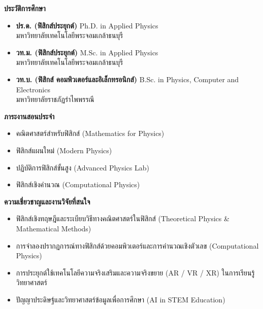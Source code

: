 \noindent
\begin{minipage}[t]{0.48\textwidth}
    {\fontsize{13}{16}\selectfont\bfseries\color{rbruGreen} ประวัติการศึกษา}\par\vspace{4pt}
    \begin{itemize}\setlength{\itemsep}{2pt}\setlength{\parsep}{0pt}\setlength{\topsep}{2pt}\setlength{\partopsep}{0pt}\setlength{\leftmargin}{12pt}
        \item \textbf{ปร.ด. (ฟิสิกส์ประยุกต์)} Ph.D. in Applied Physics\\มหาวิทยาลัยเทคโนโลยีพระจอมเกล้าธนบุรี
        \item \textbf{วท.ม. (ฟิสิกส์ประยุกต์)} M.Sc. in Applied Physics\\มหาวิทยาลัยเทคโนโลยีพระจอมเกล้าธนบุรี
        \item \textbf{วท.บ. (ฟิสิกส์ คอมพิวเตอร์และอิเล็กทรอนิกส์)} B.Sc. in Physics, Computer and Electronics\\มหาวิทยาลัยราชภัฏรำไพพรรณี
    \end{itemize}

    \vspace{0.35cm}
    {\fontsize{13}{16}\selectfont\bfseries\color{rbruGreen} ภาระงานสอนประจำ}\par\vspace{4pt}
    \begin{itemize}\setlength{\itemsep}{2pt}\setlength{\parsep}{0pt}\setlength{\topsep}{2pt}\setlength{\partopsep}{0pt}\setlength{\leftmargin}{12pt}
        \item คณิตศาสตร์สำหรับฟิสิกส์ (Mathematics for Physics)
        \item ฟิสิกส์แผนใหม่ (Modern Physics)
        \item ปฏิบัติการฟิสิกส์ขั้นสูง (Advanced Physics Lab)
        \item ฟิสิกส์เชิงคำนวณ (Computational Physics)
    \end{itemize}
\end{minipage}\hfill
\begin{minipage}[t]{0.48\textwidth}
    {\fontsize{13}{16}\selectfont\bfseries\color{rbruGreen} ความเชี่ยวชาญและงานวิจัยที่สนใจ}\par\vspace{4pt}
    \begin{itemize}\setlength{\itemsep}{3pt}\setlength{\parsep}{0pt}\setlength{\topsep}{2pt}\setlength{\partopsep}{0pt}\setlength{\leftmargin}{12pt}
        \item ฟิสิกส์เชิงทฤษฎีและระเบียบวิธีทางคณิตศาสตร์ในฟิสิกส์ (Theoretical Physics \& Mathematical Methods)
        \item การจำลองปรากฏการณ์ทางฟิสิกส์ด้วยคอมพิวเตอร์และการคำนวณเชิงตัวเลข (Computational Physics)
        \item การประยุกต์ใช้เทคโนโลยีความจริงเสริมและความจริงขยาย (AR / VR / XR) ในการเรียนรู้วิทยาศาสตร์
        \item ปัญญาประดิษฐ์และวิทยาศาสตร์ข้อมูลเพื่อการศึกษา (AI in STEM Education)
    \end{itemize}
\end{minipage}
